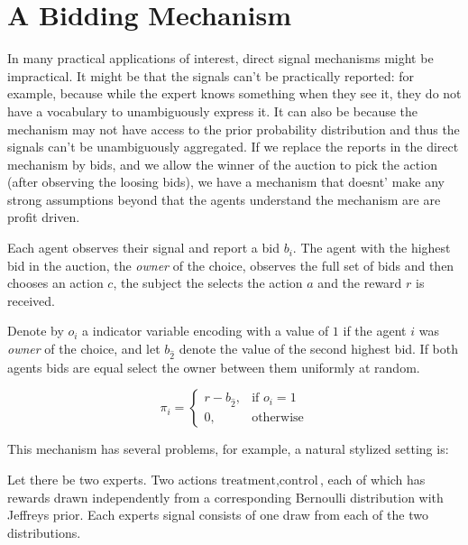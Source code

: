 \section{A Bidding Mechanism}

In many practical applications of interest, direct signal mechanisms might be impractical. It might be that the signals can't be practically reported: for example, because while the expert knows something when they see it, they do not have a vocabulary to unambiguously express it. It can also be because the mechanism may not have access to the prior  probability distribution and thus the signals can't be unambiguously aggregated. 
If we replace the reports in the direct mechanism by bids, and we allow the winner of the auction to pick the action (after observing the loosing bids), we have a mechanism that doesnt' make any strong assumptions beyond that the agents understand the mechanism are are profit driven.



\begin{mech}

Each agent observes their signal and report a bid $b_i$.
The agent with the highest bid in the auction, the \emph{owner} of the choice, observes the full set of bids and then chooses an action $c$, the subject the selects the action $a$ and the reward $r$ is received. 

Denote by $o_{i}$ a indicator variable encoding with a value of $1$ if the agent $i$ was  \emph{owner} of the choice, and let $b_{\hat{2}}$ denote the value of the second highest  bid. If both agents bids are equal  select the owner between them uniformly at random.

\[
    \pi_i =  
\begin{cases}
        r - b_{\hat{2}} ,& \text{if } o_{i} = 1 \\
		0,              & \text{otherwise}
\end{cases}
\]
\end{mech}


This mechanism has several problems, for example, a natural stylized setting is:


\begin{eg}\label{eg:two-iid-signals}
	Let there be two experts. Two actions ${\text{treatment},\text{control}}$, each of which has rewards drawn independently from a corresponding Bernoulli distribution with Jeffreys prior. Each experts signal consists of one draw from each of the two distributions.
\end{eg}

